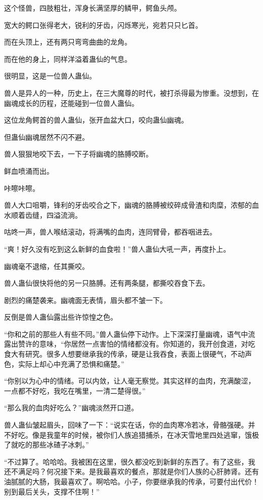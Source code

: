 \begin{this_body}
这个怪兽，四肢粗壮，浑身长满坚厚的鳞甲，鳄鱼头颅。

宽大的鳄口张得老大，锐利的牙齿，闪烁寒光，宛若只只匕首。

而在头顶上，还有两只弯弯曲曲的龙角。

而在他的身上，同样洋溢着蛊仙的气息。

很明显，这是一位兽人蛊仙。

兽人是异人的一种，历史上，在三大魔尊的时代，被打杀得最为惨重。没想到，在幽魂成长的历程，还能碰到一位兽人蛊仙。

这位龙角鳄首的兽人蛊仙，张开血盆大口，咬向蛊仙幽魂。

但蛊仙幽魂居然不闪不避。

兽人狠狠地咬下去，一下子将幽魂的胳膊咬断。

鲜血喷涌而出。

咔嚓咔嚓。

兽人大口咀嚼，锋利的牙齿咬合之下，幽魂的胳膊被绞碎成骨渣和肉糜，浓郁的血水顺着齿缝，四溢流淌。

咕咚一声，兽人喉结滚动，将满嘴的血肉，连同臂骨，都吞咽进去。

“爽！好久没有吃到这么新鲜的血食啦！”兽人蛊仙大吼一声，再度扑上。

幽魂毫不退缩，任其撕咬。

兽人蛊仙很快将他的另一只胳膊。还有两条腿，都撕咬吞食下去。

剧烈的痛楚袭来。幽魂面无表情，眉头都不皱一下。

反倒是兽人蛊仙露出些许惊惶之色。

“你和之前的那些人有些不同。”兽人蛊仙停下动作。上下深深打量幽魂，语气中流露出赞许的意味，“你居然一点害怕的情绪都没有。你知道的，我开创食道，对吃食大有研究。很多人想要继承我的传承，硬是让我吞食，表面上很硬气，不动声色，实际上却心中充满了恐惧和痛楚。”

“你别以为心中的情绪。可以内敛，让人毫无察觉。其实这样的血肉，充满酸涩，一点都不好吃，我吃在嘴里，一清二楚得很。”

“那么我的血肉好吃么？”幽魂淡然开口道。

兽人蛊仙皱起眉头，回味了一下：“说实在话，你的血肉寒冷若冰，骨骼强硬。并不好吃。像是我童年的时候，被你们人族追猎捕杀，在冰天雪地里四处逃窜，饿极了就吃的那些冰碴子冰刺。”

“不过算了。哈哈哈。我被困在这里，很久都没吃到新鲜的东西了。有了这些，我还不满足吗？何况接下来。是我最喜欢的餐点，那就是你们人族的心肝肺肾。还有油腻腻的大肠，我最喜欢了。啊哈哈。小子，你要继承我的传承，可要付出代价！别到最后关头，支撑不住啊！”


\end{this_body}
